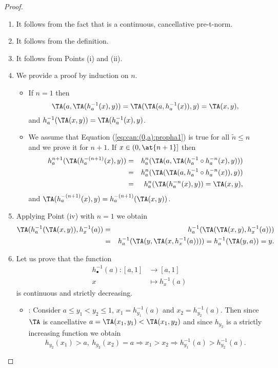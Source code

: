 \begin{proof}
	\begin{enumerate}[label=(\roman*)]
	\item  It follows from the fact that \TA is a continuous, cancellative pre-t-norm.
	\item It follows from the definition.
	\item  It follows from Points (i) and (ii).
	\item We provide a proof by induction on $n$.
	\begin{itemize}
		\item If $n=1$ then 
		$$\TA(a,\TA(h_a^{-1}(x),y)) = \TA(\TA(a,h_a^{-1}(x)),y)=\TA(x,y),$$
		and $h_a^{-1}(\TA(x,y))=\TA(h_a^{-1}(x),y)$.
		\item We assume that Equation (\ref{eq:can:(0,a):propha1}) is true for all $\tilde{n} \leq n$ and we prove it for $n+1$. If $x \in (0,\at{n+1}]$ then
		\begin{eqnarray*}
			h_a^{n+1}(\TA(h_a^{-(n+1)}(x),y)) & = & h_a^{n}(\TA(a,\TA(h_a^{-1} \circ h_a^{-n}(x),y))) \\
			&=& h_a^{n}(\TA(\TA(a,h_a^{-1}\circ h_a^{-n}(x)),y)) \\
			&=& h_a^{n}(\TA(h_a^{-n}(x),y))=\TA(x,y),
		\end{eqnarray*}
		and $\TA(h_a^{-(n+1)}(x),y) = h_a^{-(n+1)}(\TA(x,y))$.
	\end{itemize}
	\item Applying Point (iv) with $n=1$ we obtain 
	\begin{eqnarray*}
		\TA(h_a^{-1}(\TA(x,y)),h_x^{-1}(a)) &=& h_a^{-1}(\TA(\TA(x,y),h_x^{-1}(a)))\\
		&=& h_a^{-1}(\TA(y,\TA(x,h_x^{-1}(a)))) = h_a^{-1}(\TA(y,a))=y.
	\end{eqnarray*}
	\item Let us prove that the function
	\begin{align*}
		h_{\bullet}^{-1}(a) \colon [a,1] &\to [a,1]\\
		x &\mapsto h_x^{-1}(a)
	\end{align*}
	is continuous and strictly decreasing.
	\begin{itemize}
		\item \underline{}: Consider $a\leq y_1<y_2 \leq 1$, $x_1=h_{y_1}^{-1}(a)$ and $x_2 =h_{y_2}^{-1}(a)$. Then since $\TA$ is cancellative  $a=\TA(x_1,y_1) < \TA(x_1,y_2)$ and since $h_{y_2}$ is a strictly increasing function we obtain
		$$
		h_{y_2}(x_1)>a,~ h_{y_2}(x_2)=a \Rightarrow x_1>x_2 \Rightarrow h_{y_1}^{-1}(a) > h_{y_2}^{-1}(a).
$$
\end{itemize}
\end{enumerate}
\end{proof}
